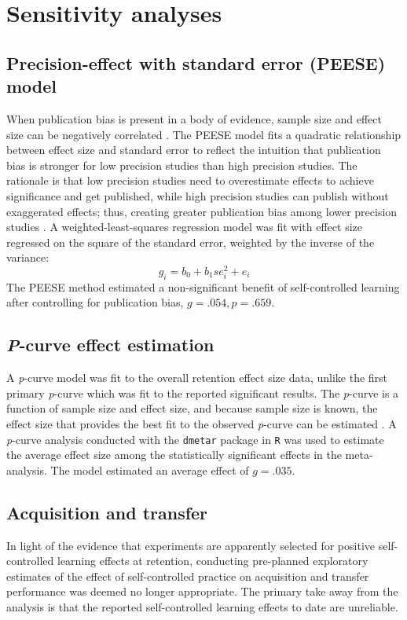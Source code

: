 \documentclass[man,floatsintext,hidelinks]{apa7}
\begin{document}
\section{Sensitivity analyses} 
\subsection{Precision-effect with standard error (PEESE) model}
When publication bias is present in a body of evidence, sample size and effect size can be negatively correlated \parencite{Stanley2014-xl}. The PEESE model fits a quadratic relationship between effect size and standard error to reflect the intuition that publication bias is stronger for low precision studies than high precision studies. The rationale is that low precision studies need to overestimate effects to achieve significance and get published, while high precision studies can publish without exaggerated effects; thus, creating greater publication bias among lower precision studies \parencite{Carter2019-vv,Stanley2014-xl}. A weighted-least-squares regression model was fit with effect size regressed on the square of the standard error, weighted by the inverse of the variance:
\[g_{i} = b_{0} + b_{1}se_{i}^2 + e_{i}\]
The PEESE method estimated a non-significant benefit of self-controlled learning after controlling for publication bias, $g = .054, p = .659$.

\subsection{\emph{P}-curve effect estimation}
A \emph{p}-curve model was fit to the overall retention effect size data, unlike the first primary \emph{p}-curve which was fit to the reported significant results. The \emph{p}-curve is a function of sample size and effect size, and because sample size is known, the effect size that provides the best fit to the observed \emph{p}-curve can be estimated \parencite{Simonsohn2014-xq}. A \emph{p}-curve analysis conducted with the \texttt{dmetar} package \parencite{Harrer2019-yv} in \texttt{R} was used to estimate the average effect size among the statistically significant effects in the meta-analysis. The model estimated an average effect of $g = .035$.\footnotemark


\subsection{Acquisition and transfer}
In light of the evidence that experiments are apparently selected for positive self-controlled learning effects at retention, conducting pre-planned exploratory estimates of the effect of self-controlled practice on acquisition and transfer performance was deemed no longer appropriate. The primary take away from the analysis is that the reported self-controlled learning effects to date are unreliable.
\end{document}

